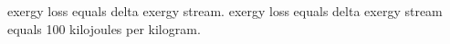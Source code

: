 exergy loss equals delta exergy stream.  
exergy loss equals delta exergy stream equals 100 kilojoules per kilogram.
